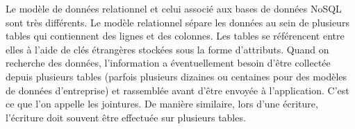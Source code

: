 Le modèle de données relationnel et celui associé aux bases de données NoSQL sont très différents. Le modèle relationnel sépare les données au sein de plusieurs tables qui contiennent des lignes et des colonnes. Les tables se référencent entre elles à l'aide de clés étrangères stockées sous la forme d'attributs. Quand on recherche des données, l'information a éventuellement besoin d'être collectée depuis plusieurs tables (parfois plusieurs dizaines ou centaines pour des modèles de données d'entreprise) et rassemblée avant d'être envoyée à l'application. C'est ce que l'on appelle les jointures. De manière similaire, lors d'une écriture, l'écriture doit souvent être effectuée sur plusieurs tables.\\




